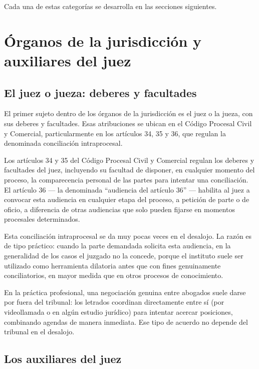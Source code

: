 \documentclass[12pt,oneside]{book}
\begin{document}
Cada una de estas categorías se desarrolla en las secciones siguientes.

\section{Órganos de la jurisdicción y auxiliares del juez}

\subsection{El juez o jueza: deberes y facultades}

El primer sujeto dentro de los órganos de la jurisdicción es el juez o la jueza, con sus deberes y facultades. Esas atribuciones se ubican en el Código Procesal Civil y Comercial, particularmente en los artículos 34, 35 y 36, que regulan la denominada conciliación intraprocesal.

\begin{important}
Los artículos 34 y 35 del Código Procesal Civil y Comercial regulan los deberes y facultades del juez, incluyendo su facultad de disponer, en cualquier momento del proceso, la comparecencia personal de las partes para intentar una conciliación. El artículo 36 --- la denominada ``audiencia del artículo 36'' --- habilita al juez a convocar esta audiencia en cualquier etapa del proceso, a petición de parte o de oficio, a diferencia de otras audiencias que solo pueden fijarse en momentos procesales determinados.
\end{important}

Esta conciliación intraprocesal se da muy pocas veces en el desalojo. La razón es de tipo práctico: cuando la parte demandada solicita esta audiencia, en la generalidad de los casos el juzgado no la concede, porque el instituto suele ser utilizado como herramienta dilatoria antes que con fines genuinamente conciliatorios, en mayor medida que en otros procesos de conocimiento.

En la práctica profesional, una negociación genuina entre abogados suele darse por fuera del tribunal: los letrados coordinan directamente entre sí (por videollamada o en algún estudio jurídico) para intentar acercar posiciones, combinando agendas de manera inmediata. Ese tipo de acuerdo no depende del tribunal en el desalojo.

\subsection{Los auxiliares del juez}
\end{document}
